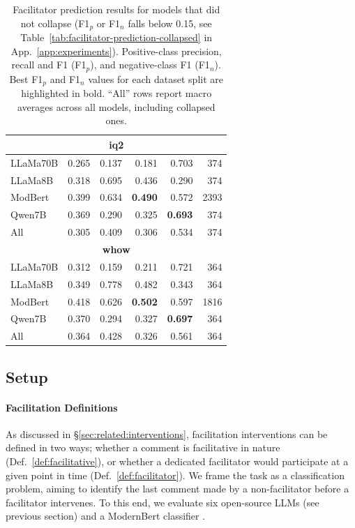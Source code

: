 \documentclass[11pt]{article}
\theoremstyle{definition}
\theoremstyle{plain}
\begin{document}
\begin{table}[ht]
\begin{tabular}{lrrrrr}
		\midrule
		\multicolumn{6}{c}{\textbf{\ac{iq2}}} \\
		\midrule
		LLaMa70B & 0.265 & 0.137 & 0.181 & 0.703 & 374 \\
		LLaMa8B  & 0.318 & 0.695 & 0.436 & 0.290 & 374 \\
		ModBert  & 0.399 & 0.634 & \textbf{0.490} & 0.572 & 2393 \\
		Qwen7B   & 0.369 & 0.290 & 0.325 & \textbf{0.693} & 374 \\
		{All} & {0.305} & {0.409} & {0.306} & {0.534} & {374} \\
		
		\midrule
		\multicolumn{6}{c}{\textbf{\ac{whow}}} \\
		\midrule
		LLaMa70B & 0.312 & 0.159 & 0.211 & 0.721 & 364 \\
		LLaMa8B  & 0.349 & 0.778 & 0.482 & 0.343 & 364 \\
		ModBert  & 0.418 & 0.626 & \textbf{0.502} & 0.597 & 1816 \\
		Qwen7B   & 0.370 & 0.294 & 0.327 & \textbf{0.697} & 364 \\
		{All} & {0.364} & {0.428} & {0.326} & {0.561} & {364} \\
		
		\midrule
		\bottomrule
	\end{tabular}
	\caption{Facilitator prediction results for models that did not collapse (F1$_p$ or F1$_n$ falls below 0.15, see Table~\ref{tab:facilitator-prediction-collapsed} in App.~\ref{app:experiments}). Positive-class precision, recall and F1 (F1$_p$), and negative-class F1 (F1$_n$). Best F1$_p$ and F1$_n$ values for each dataset split are highlighted in bold. ``All'' rows report macro averages across all models, including collapsed ones.}
	\label{tab:facilitator-prediction}
\end{table}


\subsection{Setup}

\paragraph{Facilitation Definitions} As discussed in \S\ref{sec:related:interventions}, facilitation interventions can be defined in two ways; whether a comment is facilitative in nature (Def.~\ref{def:facilitative}), or whether a dedicated facilitator would participate at a given point in time (Def.~\ref{def:facilitator}).  We frame the task as a classification problem, aiming to identify the last comment made by a non-facilitator before a facilitator intervenes. To this end, we evaluate six open-source LLMs (see previous section) and a ModernBert classifier \citep{warner-etal-2025-smarter}.
\end{document}
